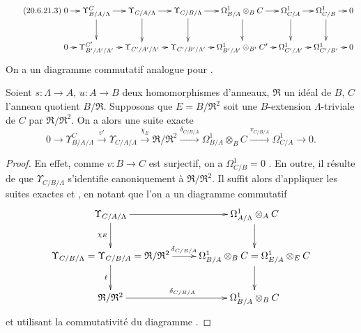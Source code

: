\begin{remarks}[20.6.21]
\begin{enumerate}
\begin{equation}
\tag{20.6.21.3}
\label{0.20.6.21.3-fr}
\xymatrix@C=0.7em{
  0 \ar[r] & \Upsilon^C_{B/A/\Lambda} \ar[r] \ar[d] &
  \Upsilon_{C/A/\Lambda} \ar[r] \ar[d] &
  \Upsilon_{C/B/\Lambda} \ar[r] \ar[d] &
  \Omega^1_{B/A}\otimes_B C \ar[r] \ar[d] &
  \Omega^1_{C/A} \ar[r] \ar[d] &
  \Omega^1_{C/B} \ar[r] \ar[d] & 0 \\
  0 \ar[r] & \Upsilon^{C'}_{B'/A'/\Lambda'} \ar[r] &
  \Upsilon_{C'/A'/\Lambda'} \ar[r] &
  \Upsilon_{C'/B'/\Lambda'} \ar[r] &
  \Omega^1_{B'/A'}\otimes_{B'} C' \ar[r] &
  \Omega^1_{C'/A'} \ar[r] & \Omega^1_{C'/B'} \ar[r] & 0
}
\end{equation}
On a un diagramme commutatif analogue pour .
\end{enumerate}
\end{remarks}

\begin{proposition}[20.6.22]
\label{0.20.6.22-fr}
Soient $s:\Lambda\to A$, $u:A\to B$ deux homomorphismes d'anneaux,
$\mathfrak{R}$ un idéal de $B$, $C$ l'anneau quotient $B/\mathfrak{R}$.
Supposons que $E=B/\mathfrak{R}^2$ soit une $B$-extension
$\Lambda$-triviale de $C$ par $\mathfrak{R}/\mathfrak{R}^2$. On a alors une
suite exacte
\begin{equation}
\tag{20.6.22.1}
\label{0.20.6.22.1-fr}
  0\to\Upsilon^C_{B/A/\Lambda}\xrightarrow{v'}
  \Upsilon_{C/A/\Lambda}\xrightarrow{\chi_E}
  \mathfrak{R}/\mathfrak{R}^2\xrightarrow{\delta_{C/B/A}}
  \Omega^1_{B/A}\otimes_B C\xrightarrow{v_{C/B/A}}
  \Omega^1_{C/A}\to0.
\end{equation}
\end{proposition}

\begin{proof}
En effet, comme $v:B\to C$ est surjectif, on a $\Omega^1_{C/B}=0$
. En outre, il résulte de  que
$\Upsilon_{C/B/\Lambda}$ s'identifie canoniquement à
$\mathfrak{R}/\mathfrak{R}^2$. Il suffit alors d'appliquer les suites exactes
 et , en notant que l'on a un
diagramme commutatif
\[
\xymatrix{
  \Upsilon_{C/A/\Lambda} \ar[r] \ar[d]_{\chi_E} &
  \Omega^1_{A/\Lambda}\otimes_A C \ar[d] \\
  \Upsilon_{C/B/\Lambda}=\Upsilon_{C/B/A}=\mathfrak{R}/\mathfrak{R}^2
    \ar[r]^-{\delta_{C/B/A}} \ar[d]_{\ell} &
  \Omega^1_{B/A}\otimes_B C=\Omega^1_{E/A}\otimes_E C \ar[d] \\
  \mathfrak{R}/\mathfrak{R}^2 \ar[r]^{\delta_{C/B/A}} &
  \Omega^1_{B/A}\otimes_B C
}
\]
et utilisant la commutativité du diagramme .
\end{proof}

